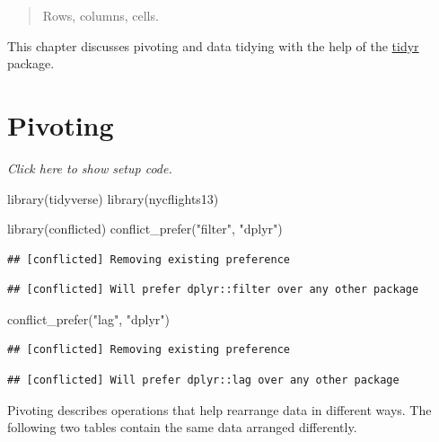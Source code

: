 \documentclass[]{book}
\newenvironment{Shaded}{}{}
\newcommand{\KeywordTok}[1]{\textcolor[rgb]{0.00,0.00,1.00}{#1}}
\newcommand{\NormalTok}[1]{#1}
\newcommand{\StringTok}[1]{\textcolor[rgb]{0.00,0.50,0.50}{#1}}
\begin{document}
\begin{quote}
Rows, columns, cells.
\end{quote}

This chapter discusses pivoting and data tidying with the help of the \href{https://tidyr.tidyverse.org/}{tidyr} package.

\hypertarget{pivoting}{%
\section{Pivoting}\label{pivoting}}

\emph{Click here to show setup code.}

\begin{Shaded}
\begin{Highlighting}[]
\KeywordTok{library}\NormalTok{(tidyverse)}
\KeywordTok{library}\NormalTok{(nycflights13)}

\KeywordTok{library}\NormalTok{(conflicted)}
\KeywordTok{conflict_prefer}\NormalTok{(}\StringTok{"filter"}\NormalTok{, }\StringTok{"dplyr"}\NormalTok{)}
\end{Highlighting}
\end{Shaded}

\begin{verbatim}
## [conflicted] Removing existing preference
\end{verbatim}

\begin{verbatim}
## [conflicted] Will prefer dplyr::filter over any other package
\end{verbatim}

\begin{Shaded}
\begin{Highlighting}[]
\KeywordTok{conflict_prefer}\NormalTok{(}\StringTok{"lag"}\NormalTok{, }\StringTok{"dplyr"}\NormalTok{)}
\end{Highlighting}
\end{Shaded}

\begin{verbatim}
## [conflicted] Removing existing preference
\end{verbatim}

\begin{verbatim}
## [conflicted] Will prefer dplyr::lag over any other package
\end{verbatim}

Pivoting describes operations that help rearrange data in different ways.
The following two tables contain the same data arranged differently.
\end{document}

